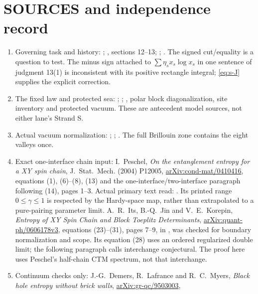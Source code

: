 \documentclass[10pt]{article}
\begin{document}
\section*{SOURCES and independence record}
\begin{enumerate}[leftmargin=*]
\item Governing task and history:
;
,
sections 12--13;
;
.
The signed cut/equality is a question to test. The minus sign attached
to $\sum\eta_sx_s\log x_s$ in one sentence of judgment 13(1) is
inconsistent with its positive rectangle integral;
\eqref{eq:s-J} supplies the explicit correction.
\item The fixed law and protected sea:
;
;
,
polar block diagonalization, site inventory and protected vacuum.
These are antecedent model sources, not either lane's Strand S.
\item Actual vacuum normalization:
;
;
.
The full Brillouin zone contains the eight valleys once.
\item Exact one-interface chain input: I.~Peschel,
\emph{On the entanglement entropy for a XY spin chain},
J.~Stat.~Mech. (2004) P12005,
\href{https://arxiv.org/abs/cond-mat/0410416}{arXiv:cond-mat/0410416},
equations (1), (6)--(8), (13) and the one-interface/two-interface
paragraph following (14), pages 1--3.
Actual primary text read:
.
Its printed range $0\le\gamma\le1$ is respected by the Hardy-space
map, rather than extrapolated to a pure-pairing parameter limit.
A.~R.~Its, B.-Q.~Jin and V.~E.~Korepin,
\emph{Entropy of XY Spin Chain and Block Toeplitz Determinants},
\href{https://arxiv.org/abs/quant-ph/0606178}{arXiv:quant-ph/0606178v3},
equations (23)--(31), pages 7--9, in
,
was checked for boundary normalization and scope. Its equation (28)
uses an ordered regularized double limit; the following paragraph
calls interchange conjectural. The proof here uses Peschel's
half-chain CTM spectrum, not that interchange.
\item Continuum checks only: J.-G.~Demers, R.~Lafrance and
R.~C.~Myers,
\emph{Black hole entropy without brick walls},
\href{https://arxiv.org/abs/gr-qc/9503003}{arXiv:gr-qc/9503003},

\end{enumerate}
\end{document}
